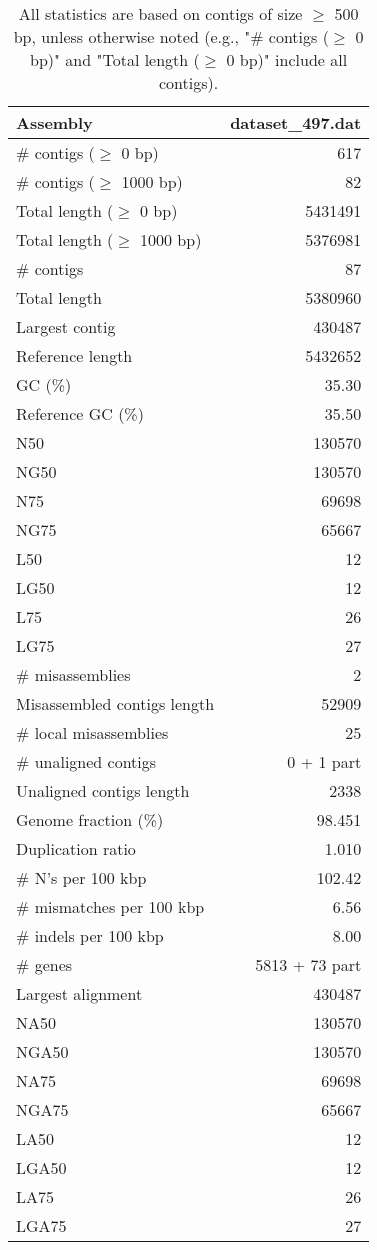 \documentclass[12pt,a4paper]{article}
\begin{document}
\begin{table}[ht]
\begin{center}
\caption{All statistics are based on contigs of size $\geq$ 500 bp, unless otherwise noted (e.g., "\# contigs ($\geq$ 0 bp)" and "Total length ($\geq$ 0 bp)" include all contigs).}
\begin{tabular}{|l*{1}{|r}|}
\hline
Assembly & dataset\_497.dat \\ \hline
\# contigs ($\geq$ 0 bp) & 617 \\ \hline
\# contigs ($\geq$ 1000 bp) & 82 \\ \hline
Total length ($\geq$ 0 bp) & 5431491 \\ \hline
Total length ($\geq$ 1000 bp) & 5376981 \\ \hline
\# contigs & 87 \\ \hline
Total length & 5380960 \\ \hline
Largest contig & 430487 \\ \hline
Reference length & 5432652 \\ \hline
GC (\%) & 35.30 \\ \hline
Reference GC (\%) & 35.50 \\ \hline
N50 & 130570 \\ \hline
NG50 & 130570 \\ \hline
N75 & 69698 \\ \hline
NG75 & 65667 \\ \hline
L50 & 12 \\ \hline
LG50 & 12 \\ \hline
L75 & 26 \\ \hline
LG75 & 27 \\ \hline
\# misassemblies & 2 \\ \hline
Misassembled contigs length & 52909 \\ \hline
\# local misassemblies & 25 \\ \hline
\# unaligned contigs & 0 + 1 part \\ \hline
Unaligned contigs length & 2338 \\ \hline
Genome fraction (\%) & 98.451 \\ \hline
Duplication ratio & 1.010 \\ \hline
\# N's per 100 kbp & 102.42 \\ \hline
\# mismatches per 100 kbp & 6.56 \\ \hline
\# indels per 100 kbp & 8.00 \\ \hline
\# genes & 5813 + 73 part \\ \hline
Largest alignment & 430487 \\ \hline
NA50 & 130570 \\ \hline
NGA50 & 130570 \\ \hline
NA75 & 69698 \\ \hline
NGA75 & 65667 \\ \hline
LA50 & 12 \\ \hline
LGA50 & 12 \\ \hline
LA75 & 26 \\ \hline
LGA75 & 27 \\ \hline
\end{tabular}
\end{center}
\end{table}
\end{document}
